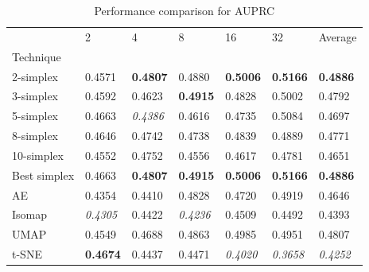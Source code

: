 \begin{table}
\caption{Performance comparison for AUPRC}
\label{tab:results_auprc}
\begin{center}
\begin{tabular}{lllllll}
\toprule
 & 2 & 4 & 8 & 16 & 32 & Average \\
Technique &  &  &  &  &  &  \\
\midrule
2-simplex & 0.4571 & \textbf{0.4807} & 0.4880 & \textbf{0.5006} & \textbf{0.5166} & \textbf{0.4886} \\
3-simplex & 0.4592 & 0.4623 & \textbf{0.4915} & 0.4828 & 0.5002 & 0.4792 \\
5-simplex & 0.4663 & \textit{0.4386} & 0.4616 & 0.4735 & 0.5084 & 0.4697 \\
8-simplex & 0.4646 & 0.4742 & 0.4738 & 0.4839 & 0.4889 & 0.4771 \\
10-simplex & 0.4552 & 0.4752 & 0.4556 & 0.4617 & 0.4781 & 0.4651 \\
Best simplex & 0.4663 & \textbf{0.4807} & \textbf{0.4915} & \textbf{0.5006} & \textbf{0.5166} & \textbf{0.4886} \\
AE & 0.4354 & 0.4410 & 0.4828 & 0.4720 & 0.4919 & 0.4646 \\
Isomap & \textit{0.4305} & 0.4422 & \textit{0.4236} & 0.4509 & 0.4492 & 0.4393 \\
UMAP & 0.4549 & 0.4688 & 0.4863 & 0.4985 & 0.4951 & 0.4807 \\
t-SNE & \textbf{0.4674} & 0.4437 & 0.4471 & \textit{0.4020} & \textit{0.3658} & \textit{0.4252} \\
\bottomrule
\end{tabular}
\end{center}
\end{table}


